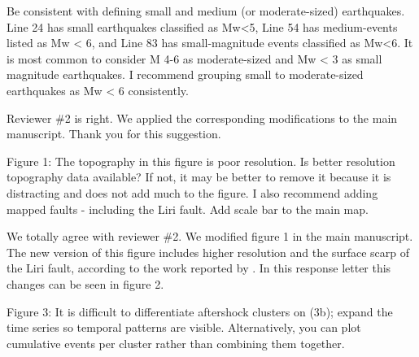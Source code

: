 \documentclass[10pt]{extarticle}
\begin{document}
\begin{ReviewerComment}{2}
\noindent 
Be consistent with defining small and medium (or moderate-sized) earthquakes. Line 24 has small earthquakes classified as  Mw<5, Line 54 has medium-events listed as Mw < 6, and Line 83 has small-magnitude events classified as Mw<6. It is most common to consider M 4-6 as moderate-sized and Mw < 3 as small magnitude earthquakes. I recommend grouping small to moderate-sized earthquakes as Mw < 6 consistently.

\end{ReviewerComment}


\begin{Answer}
Reviewer \#2 is right. We applied the corresponding modifications to the main manuscript. Thank you for this suggestion.
 \WorkInProgressRevTask
\end{Answer}
%
%




\begin{ReviewerComment}{2}
\noindent 
Figure 1: The topography in this figure is poor resolution. Is better resolution topography data available? If not, it may be better to remove it because it is distracting and does not add much to the figure. I also recommend adding mapped faults - including the Liri fault. Add scale bar to the main map.

\end{ReviewerComment}


\begin{Answer}
We totally agree with reviewer \#2. We modified figure 1 in the main manuscript. The new version of this figure includes higher resolution and the surface scarp of the Liri fault, according to the work reported by \cite{wedmore2017667}. In this response letter this changes can be seen in figure 2.
 \WorkInProgressRevTask
\end{Answer}
%
%



\begin{ReviewerComment}{2}
\noindent 
Figure 3: It is difficult to differentiate aftershock clusters on (3b); expand the time series so temporal patterns are visible. Alternatively, you can plot cumulative events per cluster rather than combining them together.  

\end{ReviewerComment}
\end{document}
